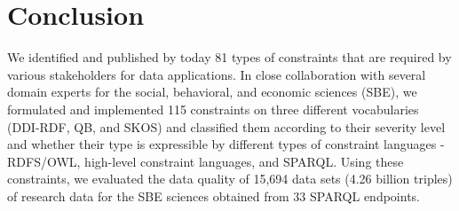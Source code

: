 \documentclass{llncs}
\begin{document}
\section{Conclusion}

We identified and published by today 81 types of constraints that are required by various stakeholders for data applications.
In close collaboration with several domain experts for the social, behavioral, and economic sciences (SBE), we formulated and implemented 115 constraints on three different vocabularies (DDI-RDF, QB, and SKOS) and classified them according to their severity level and  whether their type is expressible by different types of constraint languages - RDFS/OWL, high-level constraint languages, and SPARQL. 
Using these constraints, we evaluated  the data quality of 15,694 data sets (4.26 billion triples) of research data for the SBE sciences obtained from 33 SPARQL endpoints.

{}

\setcounter{tocdepth}{1}
\end{document}
